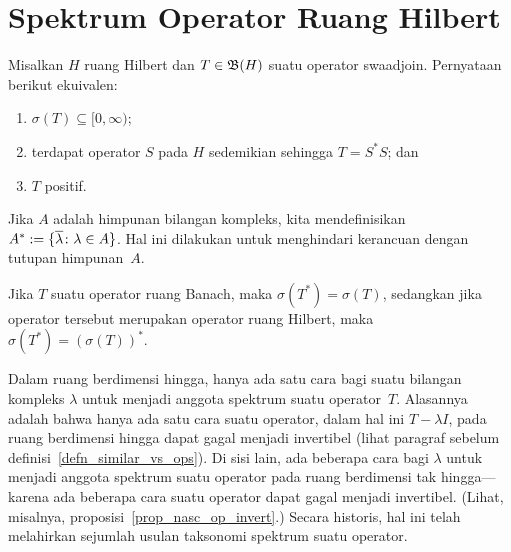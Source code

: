 \section{Spektrum Operator Ruang Hilbert}
\begin{prop} Misalkan $H$ ruang Hilbert dan $T \in \mathfrak{B}(H)$ suatu operator swaadjoin. Pernyataan berikut
ekuivalen:
 \begin{enumerate}
    \item[(i)] $\sigma(T) \subseteq [0,\infty)$;
    \item[(ii)] terdapat operator $S$ pada $H$ sedemikian sehingga $T = S^*S$; dan
    \item[(iii)] $T$ positif.
 \end{enumerate}
\end{prop}

\begin{notn} Jika $A$ adalah himpunan bilangan kompleks, kita
mendefinisikan $A^* := \{\overline{\lambda} \colon \lambda \in A\}$. Hal ini dilakukan untuk menghindari kerancuan dengan tutupan himpunan~$A$.
\end{notn}

\begin{prop} Jika $T$ suatu operator ruang Banach, maka $\sigma(T^*) = \sigma(T)$, sedangkan jika operator tersebut merupakan operator ruang Hilbert,
maka $\sigma(T^*) = (\sigma(T))^*$.
\end{prop}

Dalam ruang berdimensi hingga, hanya ada satu cara bagi suatu bilangan kompleks $\lambda$ untuk menjadi anggota spektrum suatu operator~$T$.
Alasannya adalah bahwa hanya ada satu cara suatu operator, dalam hal ini $T - \lambda I$, pada ruang berdimensi hingga dapat gagal
menjadi invertibel (lihat paragraf sebelum definisi~\ref{defn_similar_vs_ops}). Di sisi lain, ada beberapa cara bagi $\lambda$
untuk menjadi anggota spektrum suatu operator pada ruang berdimensi tak hingga---karena ada beberapa cara suatu operator dapat gagal
menjadi invertibel. (Lihat, misalnya, proposisi~\ref{prop_nasc_op_invert}.) Secara historis, hal ini telah melahirkan sejumlah usulan
taksonomi spektrum suatu operator.

